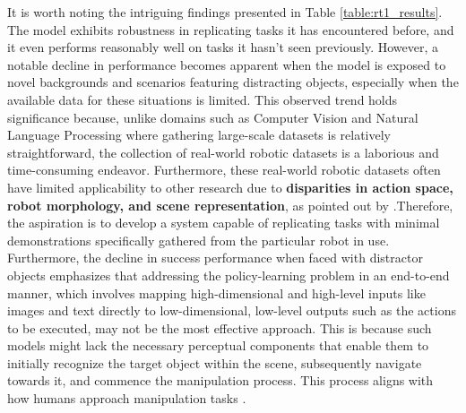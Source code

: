It is worth noting the intriguing findings presented in Table \ref{table:rt1_results}. The model exhibits robustness in replicating tasks it has encountered before, and it even performs reasonably well on tasks it hasn't seen previously. However, a notable decline in performance becomes apparent when the model is exposed to novel backgrounds and scenarios featuring distracting objects, especially when the available data for these situations is limited. This observed trend holds significance because, unlike domains such as Computer Vision and Natural Language Processing where gathering large-scale datasets is relatively straightforward, the collection of real-world robotic datasets is a laborious and time-consuming endeavor. Furthermore, these real-world robotic datasets often have limited applicability to other research due to \textbf{disparities in action space, robot morphology, and scene representation}, as pointed out by \cite{brohan2022rt}.Therefore, the aspiration is to develop a system capable of replicating tasks with minimal demonstrations specifically gathered from the particular robot in use.
\newline Furthermore, the decline in success performance when faced with distractor objects emphasizes that addressing the policy-learning problem in an end-to-end manner, which involves mapping high-dimensional and high-level inputs like images and text directly to low-dimensional, low-level outputs such as the actions to be executed, may not be the most effective approach. This is because such models might lack the necessary perceptual components that enable them to initially recognize the target object within the scene, subsequently navigate towards it, and commence the manipulation process. This process aligns with how humans approach manipulation tasks \cite{grill2003neural}.


